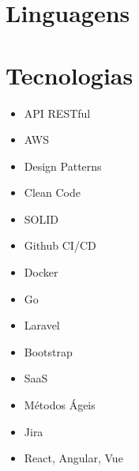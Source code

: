 \documentclass[a4paper]{curriculo}
\begin{document}
\begin{minipage}[t]{0.45\textwidth}
    \vspace{-\baselineskip}
	\section{Linguagens}
	\vspace{-1.2em}
	\begin{barchart}{3}
	\end{barchart}
\end{minipage}
\hfill %
\begin{minipage}[t]{0.55\textwidth}
    \vspace{-\baselineskip}
	\section{Tecnologias}
		\begin{minipage}[t]{0.45\textwidth}
			\begin{itemize}[itemsep=0.01em,topsep=0pt,leftmargin=*]
				\item API RESTful
				\item AWS
				\item Design Patterns
				\item Clean Code
				\item SOLID
				\item Github CI/CD
				\item Docker
			\end{itemize}
		\end{minipage}
		\begin{minipage}[t]{0.45\textwidth}
			\begin{itemize}[itemsep=0.01em,topsep=0pt,leftmargin=*]
				\item Go
				\item Laravel
				\item Bootstrap
				\item SaaS
				\item Métodos Ágeis
				\item Jira
				\item React, Angular, Vue
			\end{itemize}
	\end{minipage}
\end{minipage}

\end{document}
